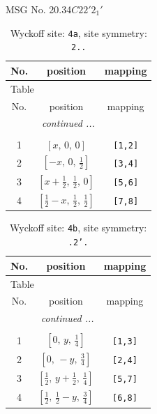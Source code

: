 \documentclass[fleqn,8pt]{jsarticle}
\begin{document}
\setcounter{MaxMatrixCols}{32}

\renewcommand{\tablename}{Table~}
\renewcommand{\figurename}{Figure~}
\begin{center}
\LARGE
MSG No. 20.34\quad$C22'2_{1}'$
\end{center}
\renewcommand{\arraystretch}{1.2}
\begin{longtable}{ccc}
\caption{Wyckoff site: {\tt 4a}, site symmetry: {\tt 2..}}
 \\
 \hline \hline
No. & position & mapping \\ \hline \endfirsthead

\multicolumn{2}{l}{\tablename\ \thetable{}} \\
 \hline \hline
No. & position & mapping \\ \hline \endhead

 \hline \hline
\multicolumn{2}{r}{\footnotesize\it continued ...} \\ \endfoot

 \hline \hline
\multicolumn{2}{r}{} \\ \endlastfoot

1 & $\left[ x,\, 0,\, 0 \right]$ & {\tt [1,2]} \\ \hline
2 & $\left[ - x,\, 0,\, \frac{1}{2} \right]$ & {\tt [3,4]} \\ \hline
3 & $\left[ x + \frac{1}{2},\, \frac{1}{2},\, 0 \right]$ & {\tt [5,6]} \\ \hline
4 & $\left[ \frac{1}{2} - x,\, \frac{1}{2},\, \frac{1}{2} \right]$ & {\tt [7,8]} \\
\end{longtable}
\renewcommand{\arraystretch}{1.2}
\begin{longtable}{ccc}
\caption{Wyckoff site: {\tt 4b}, site symmetry: {\tt .2'.}}
 \\
 \hline \hline
No. & position & mapping \\ \hline \endfirsthead

\multicolumn{2}{l}{\tablename\ \thetable{}} \\
 \hline \hline
No. & position & mapping \\ \hline \endhead

 \hline \hline
\multicolumn{2}{r}{\footnotesize\it continued ...} \\ \endfoot

 \hline \hline
\multicolumn{2}{r}{} \\ \endlastfoot

1 & $\left[ 0,\, y,\, \frac{1}{4} \right]$ & {\tt [1,3]} \\ \hline
2 & $\left[ 0,\, - y,\, \frac{3}{4} \right]$ & {\tt [2,4]} \\ \hline
3 & $\left[ \frac{1}{2},\, y + \frac{1}{2},\, \frac{1}{4} \right]$ & {\tt [5,7]} \\ \hline
4 & $\left[ \frac{1}{2},\, \frac{1}{2} - y,\, \frac{3}{4} \right]$ & {\tt [6,8]} \\
\end{longtable}
\end{document}
